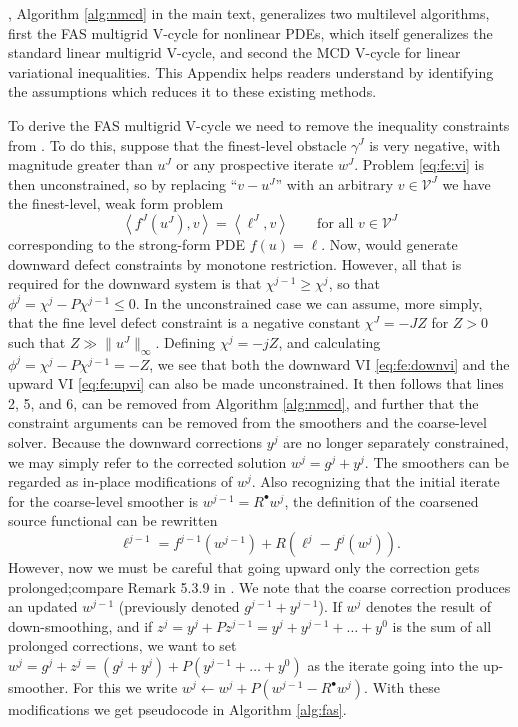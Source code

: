 \documentclass[letterpaper,final,12pt,reqno]{amsart}
\theoremstyle{cstyle}
\theoremstyle{cstyle*}
\theoremstyle{dstyle}
\numberwithin{equation}{section}
\numberwithin{figure}{section}
\numberwithin{table}{section}
\numberwithin{theorem}{section}
\newcommand{\ip}[2]{\left<#1,#2\right>}
\newcommand{\iR}{R^{\bullet}}
\begin{document}
, Algorithm \ref{alg:nmcd} in the main text, generalizes two multilevel algorithms, first the FAS multigrid V-cycle for nonlinear PDEs, which itself generalizes the standard linear multigrid V-cycle, and second the MCD V-cycle for linear variational inequalities.  This Appendix helps readers understand  by identifying the assumptions which reduces it to these existing methods.

To derive the FAS multigrid V-cycle we need to remove the inequality constraints from .  To do this, suppose that the finest-level obstacle $\gamma^J$ is very negative, with magnitude greater than $u^J$ or any prospective iterate $w^J$.  Problem \eqref{eq:fe:vi} is then unconstrained, so by replacing ``$v-u^J$'' with an arbitrary $v \in \mathcal{V}^J$ we have the finest-level, weak form problem
\begin{equation}
\ip{f^J(u^J)}{v} = \ip{\ell^J}{v} \qquad \text{for all } v\in \mathcal{V}^J \label{eq:app:fas:pde}
\end{equation}
corresponding to the strong-form PDE $f(u)=\ell$.  Now,  would generate downward defect constraints by monotone restriction.  However, all that is required for the downward system is that $\chi^{j-1} \ge \chi^j$, so that $\phi^j = \chi^j - P \chi^{j-1} \le 0$.  In the unconstrained case we can assume, more simply, that the fine level defect constraint is a negative constant $\chi^J = -JZ$ for $Z>0$ such that $Z \gg \|u^J\|_\infty$.  Defining $\chi^j = - jZ$, and calculating $\phi^j = \chi^j - P \chi^{j-1} = - Z$, we see that both the downward VI \eqref{eq:fe:downvi} and the upward VI \eqref{eq:fe:upvi} can also be made unconstrained.  It then follows that lines 2, 5, and 6, can be removed from Algorithm \ref{alg:nmcd}, and further that the constraint arguments can be removed from the smoothers and the coarse-level solver.  Because the downward corrections $y^j$ are no longer separately constrained, we may simply refer to the corrected solution $w^j=g^j+y^j$.  The smoothers can be regarded as in-place modifications of $w^j$.  Also recognizing that the initial iterate for the coarse-level smoother is $w^{j-1}=\iR w^j$, the definition of the coarsened source functional can be rewritten
\begin{equation}
\ell^{j-1} = f^{j-1}\left(w^{j-1}\right) + R\left(\ell^j-f^j(w^j)\right). \label{eq:app:fas:levelsource}
\end{equation}
However, now we must be careful that going upward only the correction gets prolonged;compare Remark 5.3.9 in \cite{Trottenbergetal2001}.  We note that the coarse correction produces an updated $w^{j-1}$ (previously denoted $g^{j-1}+y^{j-1}$).  If $w^j$ denotes the result of down-smoothing, and if $z^j = y^j + P z^{j-1} = y^j + y^{j-1} + \dots + y^0$ is the sum of all prolonged corrections, we want to set $w^j = g^j + z^j = (g^j+y^j) + P(y^{j-1} + \dots + y^0)$ as the iterate going into the up-smoother.  For this we write $w^j \gets w^j + P(w^{j-1} - \iR w^j)$.  With these modifications we get pseudocode in Algorithm \ref{alg:fas}.
\end{document}
